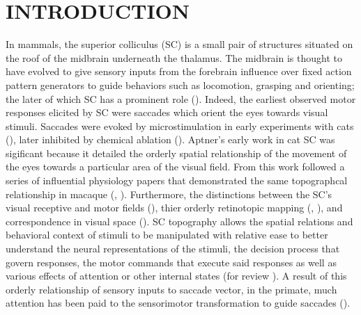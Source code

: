 \documentclass{ar-1col}
\begin{document}
\section{INTRODUCTION}
In mammals, the superior colliculus (SC) is a small pair of structures situated on the roof of the midbrain underneath the thalamus. The midbrain is thought to have evolved to give sensory  inputs from the forebrain influence over fixed action pattern generators to guide behaviors such as locomotion, grasping and orienting; the later of which SC has a prominent role (\cite{schneider2014brain}). Indeed, the earliest observed motor responses elicited by SC were saccades which orient the eyes towards visual stimuli. Saccades were evoked by microstimulation in early experiments with cats (\cite{adamuk1870dieinnervation}), later inhibited by chemical ablation (\cite{apter1946eye}). Aptner's early work in cat SC was sigificant because it detailed the orderly spatial relationship of the movement of the eyes towards a particular area of the visual field. From this work followed a series of influential physiology papers that demonstrated the same topographcal relationship in macaque (\cite{robinson1972eye}, \cite{schiller1972single}). Furthermore, the distinctions between the SC’s visual receptive and motor fields (\cite{goldberg1972activity}), thier orderly retinotopic mapping (\cite{wurtz1971superior}, \cite{robinson1972eye}), and correspondence in visual space (\cite{schiller1972single}). SC topography allows the spatial relations and behavioral context of stimuli to be manipulated with relative ease to better understand the neural representations of the stimuli, the decision process that govern responses, the motor commands that execute said responses as well as various effects of attention or other internal states (for review \cite{basso2017circuits}). A result of this orderly relationship of sensory inputs to saccade vector, in the primate, much attention has been paid to the sensorimotor transformation to guide saccades (\cite{wurtz1980visual}).  
\end{document}
